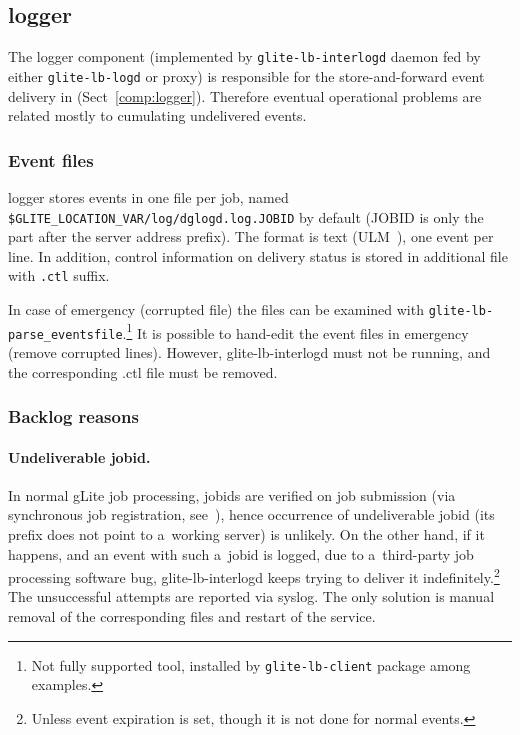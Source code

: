 \subsection{\LB logger}

\iffalse
\TODO{ljocha}

Karantena (od ktere verze to mame?)
- kdyz se nepodari rozparsovat soubor
- client/examples -- parse-logevent-file??, lze pouzit

Cistky pri zaseknuti, nesmyslna jobid apod.

Debugovaci rezim

Notifikacni IL
\fi

The logger component (implemented by \verb'glite-lb-interlogd' daemon fed by
either \verb'glite-lb-logd' or \LB proxy)
is responsible for the store-and-forward event delivery in \LB
(Sect~\ref{comp:logger}).
Therefore eventual operational problems are related mostly to 
cumulating undelivered events.

\subsubsection{Event files}

\LB logger stores events in one file per job, named
\verb'$GLITE_LOCATION_VAR/log/dglogd.log.JOBID' by default
(JOBID is only the part after the \LB server address prefix).
The format is text (ULM~\cite{ulm}), one event per line.
In addition, control information on delivery status is stored in additional
file with \verb'.ctl' suffix.

\begin{sloppypar}
In case of emergency (\eg corrupted file) the files can be examined
with \verb'glite-lb-parse_eventsfile'.\footnote{Not fully supported tool, installed
by \texttt{glite-lb-client} package among examples.}
It is possible to hand-edit the event files in emergency (remove corrupted lines).
However, glite-lb-interlogd must not be running, and the corresponding .ctl file
must be removed.
\end{sloppypar}

\subsubsection{Backlog reasons}

\paragraph{Undeliverable jobid.}
In normal gLite job processing, jobids are verified on job submission
(via synchronous job registration, see~\cite{lbug}), hence occurrence of
undeliverable jobid (\ie its prefix does not point to
a~working \LB server) is unlikely.
On the other hand, if it happens,
and an event with such a~jobid is logged,
\eg due to a~third-party job processing software bug,
glite-lb-interlogd keeps trying to deliver it indefinitely.\footnote{Unless
event expiration is set, though it is not done for normal events.}
The unsuccessful attempts are reported via syslog.
The only solution is manual
removal of the corresponding files
and restart of the service.

